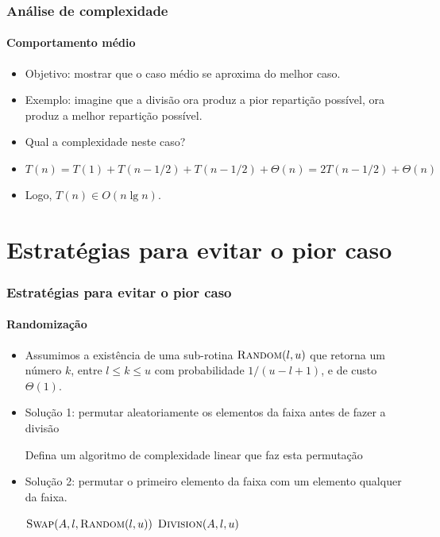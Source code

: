 \documentclass{beamer}
\begin{document}
\begin{frame}

  \frametitle{Análise de complexidade}
  \framesubtitle{Comportamento médio}

  \begin{itemize}

    \item Objetivo: mostrar que o caso médio se aproxima do melhor caso.

    \item Exemplo: imagine que a divisão ora produz a pior repartição possível,
      ora produz a melhor repartição possível.

    \item Qual a complexidade neste caso?

    \item $T(n) = T(1) + T(n-1/2) + T(n-1/2) + \Theta(n) = 2T(n-1/2) + \Theta(n)$

    \item Logo, $T(n) \in O(n \lg n)$.

  \end{itemize}

\end{frame}

\section{Estratégias para evitar o pior caso}

\begin{frame}

  \frametitle{Estratégias para evitar o pior caso}
  \framesubtitle{Randomização}

  \begin{itemize}

    \item Assumimos a existência de uma sub-rotina $\textnormal{\scshape Random}(l, u)$ que
      retorna um número $k$, entre $l \le k \le u$ com probabilidade
      $1/(u-l+1)$, e de custo $\Theta(1)$.

    \item Solução 1: permutar aleatoriamente os elementos da faixa antes de
      fazer a divisão

      \pause Defina um algoritmo de complexidade linear que faz esta
      permutação

      \pause

    \item Solução 2: permutar o primeiro elemento da faixa com um elemento
      qualquer da faixa.

\begin{codebox}
\li $\textnormal{\scshape Swap}(A, l, \textnormal{\scshape Random}(l, u))$
\li $\textnormal{\scshape Division}(A, l, u)$
\end{codebox}

  \end{itemize}

\end{frame}
\end{document}
